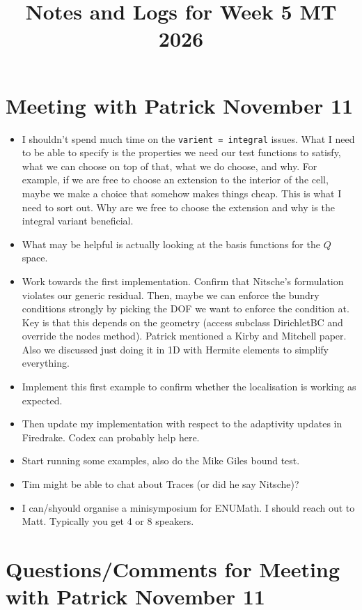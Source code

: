 \documentclass[12pt,a4paper]{article}
\title{\textbf{Notes and Logs for Week 5 MT 2026}}
\author{}
\date{}
\begin{document}
\maketitle

\section{Meeting with Patrick November 11}

\begin{itemize}
    \item I shouldn't spend much time on the \texttt{varient = integral} issues. What I need to be able to specify is the properties we need our test functions to satisfy, what we can choose on top of that, what we do choose, and why. For example, if we are free to choose an extension to the interior of the cell, maybe we make a choice that somehow makes things cheap. This is what I need to sort out. Why are we free to choose the extension and why is the integral variant beneficial. 
    \item What may be helpful is actually looking at the basis functions for the $Q$ space. 
    \item Work towards the first implementation. Confirm that Nitsche's formulation violates our generic residual. Then, maybe we can enforce the bundry conditions strongly by picking the DOF we want to enforce the condition at. Key is that this depends on the geometry (access subclass DirichletBC and override the nodes method). Patrick mentioned a Kirby and Mitchell paper. Also we discussed just doing it in 1D with Hermite elements to simplify everything. 
    \item Implement this first example to confirm whether the localisation is working as expected. 
    \item Then update my implementation with respect to the adaptivity updates in Firedrake. Codex can probably help here.
    \item Start running some examples, also do the Mike Giles bound test. 
    \item Tim might be able to chat about Traces (or did he say Nitsche)? 
    \item I can/shyould  organise a minisymposium for ENUMath. I should reach out to Matt. Typically you get 4 or 8 speakers. 
\end{itemize}

\section{Questions/Comments for Meeting with Patrick November 11}
\end{document}
